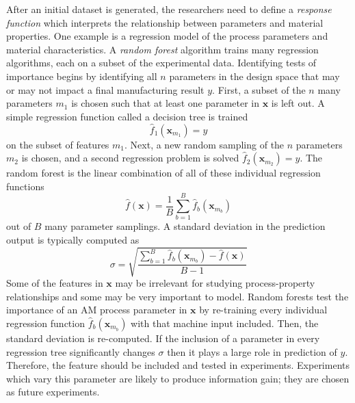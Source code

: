 After an initial dataset is generated, the researchers need to define a \textit{response function} which interprets the relationship between parameters and material properties. One example is a regression model of the process parameters and material characteristics. A \textit{random forest} algorithm trains many regression algorithms, each on a subset of the experimental data. Identifying tests of importance begins by identifying all $n$ parameters in the design space that may or may not impact a final manufacturing result $y$. First, a subset of the $n$ many parameters $m_1$ is chosen such that at least one parameter in $\mathbf{x}$ is left out. A simple regression function called a decision tree is trained
\begin{equation}
	\hat{f}_1(\mathbf{x}_{m_1}) = y
\end{equation}
on the subset of features $m_1$. Next, a new random sampling of the $n$ parameters $m_2$ is chosen, and a second regression problem is solved $\hat{f}_2(\mathbf{x}_{m_2}) = y$. The random forest is the linear combination of all of these individual regression functions
\begin{equation}
	\hat{f}(\mathbf{x}) = \frac{1}{B} \sum_{b=1}^{B} \hat{f}_b(\mathbf{x}_{m_b})
	\label{randomforest}
\end{equation}
out of $B$ many parameter samplings. A standard deviation in the prediction output is typically computed as
\begin{equation}
	\sigma = \sqrt{\frac{\sum_{b=1}^B \hat{f}_b(\mathbf{x}_{m_b}) - \hat{f}(\mathbf{x})}{B-1}}
	\label{rfstddev}
\end{equation}
Some of the features in $\mathbf{x}$ may be irrelevant for studying process-property relationships and some may be very important to model. Random forests test the importance of an AM process parameter in $\mathbf{x}$ by re-training every individual regression function $\hat{f}_b(\mathbf{x}_{m_b})$ with that machine input included. Then, the standard deviation is re-computed. If the inclusion of a parameter in every regression tree significantly changes $\sigma$ then it plays a large role in prediction of $y$. Therefore, the feature should be included and tested in experiments. Experiments which vary this parameter are likely to produce information gain; they are chosen as future experiments.

